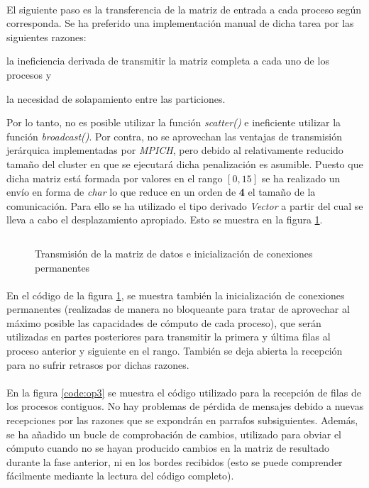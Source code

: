 \documentclass[10pt, a4paper,spanish]{article}
\begin{document}
		\paragraph{}
		El siguiente paso es la transferencia de la matriz de entrada a cada proceso según corresponda. Se ha preferido una implementación manual de dicha tarea por las siguientes razones: \begin {enumerate*} [label=\itshape\alph*\upshape)]
					\item la ineficiencia derivada de transmitir la matriz completa a cada uno de los procesos y
					\item la necesidad de solapamiento entre las particiones.
		\end {enumerate*} Por lo tanto, no es posible utilizar la función \emph{scatter()} e ineficiente utilizar la función \emph{broadcast()}. Por contra, no se aprovechan las ventajas de transmisión jerárquica implementadas por \emph{MPICH}, pero debido al relativamente reducido tamaño del cluster en que se ejecutará dicha penalización es asumible. Puesto que dicha matriz está formada por valores en el rango $[0,15]$ se ha realizado un envío en forma de \emph{char} lo que reduce en un orden de \textbf{4} el tamaño de la comunicación. Para ello se ha utilizado el tipo derivado \emph{Vector} a partir del cual se lleva a cabo el desplazamiento apropiado.  Esto se muestra en la figura \ref{code:op2}.

		\begin{figure}[h]
			\centering
			\inputminted{c}{./code/op2.c}
			\caption{Transmisión de la matriz de datos e inicialización de conexiones permanentes}
			\label{code:op2}
		\end{figure}

		\paragraph{}
		En el código de la figura \ref{code:op2}, se muestra también la inicialización de conexiones permanentes (realizadas de manera no bloqueante para tratar de aprovechar al máximo posible las capacidades de cómputo de cada proceso), que serán utilizadas en partes posteriores para transmitir la primera y última filas al proceso anterior y siguiente en el rango. También se deja abierta la recepción para no sufrir retrasos por dichas razones.

		\paragraph{}
		En la figura \ref{code:op3} se muestra el código utilizado para la recepción de filas de los procesos contiguos. No hay problemas de pérdida de mensajes debido a nuevas recepciones por las razones que se expondrán en parrafos subsiguientes. Además, se ha añadido un bucle de comprobación de cambios, utilizado para obviar el cómputo cuando no se hayan producido cambios en la matriz de resultado durante la fase anterior, ni en los bordes recibidos (esto se puede comprender fácilmente mediante la lectura del código completo).
\end{document}
